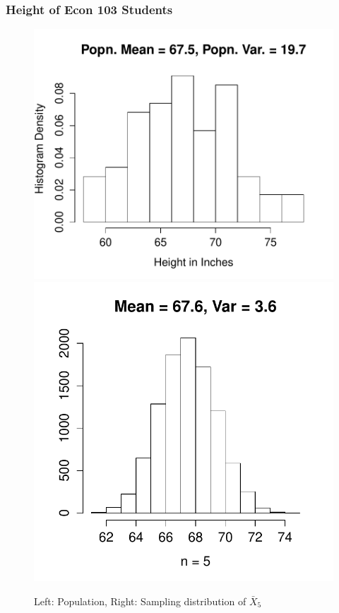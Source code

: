 \begin{frame}
\frametitle{Height of Econ 103 Students}
\begin{figure}
\includegraphics[scale = 0.4]{./images/height_hist}
\includegraphics[scale = 0.4]{./images/height_mean_n_5}
\caption{Left: Population, Right: Sampling distribution of $\bar{X}_5$}
\end{figure}
\end{frame}


